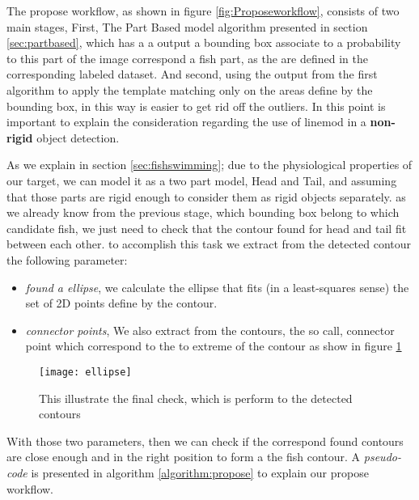 The propose workflow, as shown in figure \ref{fig:Proposeworkflow}, consists of two
main stages, First, The Part Based model algorithm presented in section \ref{sec:partbased}, which 
has a a output a bounding box associate to a probability to this part of the image correspond a
fish part, as the are defined in the corresponding labeled dataset. And second, using the output
from the first algorithm to apply the template matching only on the areas define by the bounding box,
in this way is easier to get rid off the outliers. In this point is important to explain
the consideration regarding the use of linemod in a \textbf{non-rigid} object detection.

As we explain in section \ref{sec:fishswimming}; due to the physiological properties of
our target, we can model it as a two part model, Head and Tail, and assuming that those
parts are rigid enough to consider them as rigid objects separately. as we already know from 
the previous stage, which bounding box belong to which candidate fish, we just need to check
that the contour found for head and tail fit between each other. to accomplish this task
we extract from the detected contour the following parameter:
\begin{itemize}
\item \textit{found a ellipse}, we calculate the ellipse that fits (in a least-squares sense) the set of 2D points define by the contour.
\item \textit{connector points}, We also extract from the contours, the so call, connector point
which correspond to the to extreme of the contour as show in figure \ref{fig:ellipse}
\end{itemize}

\begin{figure}[ht]
\begin{adjustwidth}{-1in}{-1in}
\centering
\texttt{[image: ellipse]}
\caption{This illustrate the final check, which is perform to the detected contours}
\label{fig:ellipse}
\end{adjustwidth}
\end{figure}

With those two parameters, then we can check if the correspond found contours are close enough
and in the right position to form a the fish contour. A \textit{pseudo-code} is presented 
in algorithm \ref{algorithm:propose}
to explain our propose workflow.


